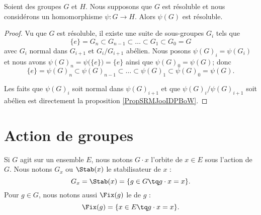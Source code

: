 \begin{proposition} \label{PropBNEZooJMDFIB}
    Soient des groupes \( G\) et \( H\). Nous supposons que \( G\) est résoluble et nous considérons un homomorphisme \( \psi\colon G\to H\). Alors \( \psi(G)\) est résoluble.
\end{proposition}

\begin{proof}
    Vu que \( G\) est résoluble, il existe une suite de sous-groupes \( G_i\) tels que
    \begin{equation}
        \{ e \}=G_n\subset G_{n-1}\subset\ldots\subset G_1\subset G_0=G
    \end{equation}
    avec \( G_i\) normal dans \( G_{i+1}\) et \( G_i/G_{i+1}\) abélien. Nous posons \( \psi(G)_i=\psi(G_i)\) et nous avons \( \psi(G)_n=\psi\big( \{ e \} \big)=\{ e \}\) ainsi que \( \psi(G)_0=\psi(G)\); donc
    \begin{equation}
        \{ e \}=\psi(G)_n\subset \psi(G)_{n-1}\subset\ldots\subset \psi(G)_1\subset \psi(G)_0=\psi(G).
    \end{equation}

    Les faits que \( \psi(G)_i\) soit normal dans \( \psi(G)_{i+1}\) et que \( \psi(G)_i/\psi(G)_{i+1}\) soit abélien est directement la proposition \ref{PropSRMJooIDPBoW}.

\end{proof}


\section{Action de groupes}

Si \( G\) agit sur un ensemble \( E\), nous notons \( G\cdot x\) l'orbite de \( x\in E\) sous l'action de $G$. Nous notons \( G_x\) ou \( \Stab(x)\) le stabilisateur de \( x\) :
\begin{equation}
    G_x=\Stab(x)=\{ g\in G\tq g\cdot x=x \}.
\end{equation}
Pour \( g\in G\), nous notons aussi \( \Fix(g)\) le  de \( g\) :
\begin{equation}
    \Fix(g)=\{ x\in E\tq g\cdot x=x \}.
\end{equation}

